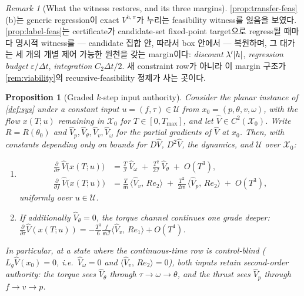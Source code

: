 \documentclass[11pt]{article}
\theoremstyle{plain}
\newtheorem{proposition}[theorem]{Proposition}
\theoremstyle{definition}
\theoremstyle{remark}
\newtheorem{remark}[theorem]{Remark}
\DeclarePairedDelimiter{\abs}{\lvert}{\rvert}
\newcommand{\inner}[2]{\langle #1,\,#2\rangle}
\newcommand{\calX}{\mathcal{X}}
\newcommand{\calU}{\mathcal{U}}
\newcommand{\Vhp}[1]{V^{h,#1}}
\newcommand{\Vhpi}{\Vhp{\pi}}
\newcommand{\Vhat}{\widehat V}
\newcommand{\mass}{\mathsf m}
\newcommand{\inertia}{\mathcal I}
\newcommand{\Lg}{L_g}
\begin{document}
\begin{remark}[What the witness restores, and its three margins]\label{rem:label-margins}
\cref{prop:transfer-feas}(b)는 generic regression이 exact $\Vhpi$가 누리는 feasibility witness를
잃음을 보였다. \cref{prop:label-feas}는 certificate가 candidate-set fixed-point target으로 regress될
때마다 명시적 witness를 --- candidate 집합 안, 따라서 box 안에서 --- 복원하며, 그 대가는 세 개의
개별 제어 가능한 원천을 갖는 margin이다: \emph{discount} $\lambda'\abs{h}$, \emph{regression
budget} $\varepsilon/\Delta t$, \emph{integration} $C_2\Delta t/2$. 새 constraint row가 아니라 이
margin 구조가 \cref{rem:viability}의 recursive-feasibility 정제가 사는 곳이다.
\end{remark}

\begin{proposition}[Graded $k$-step input authority]\label{prop:kstep}
Consider the planar instance of \cref{def:sys} under a constant input $u=(f,\tau)\in\calU$ from
$x_0=(p,\theta,v,\omega)$, with the flow $x(T;u)$ remaining in $\calX_0$ for
$T\in[0,T_{\max}]$, and let $\Vhat\in C^2(\calX_0)$. Write $R=R(\theta_0)$ and
$\Vhat_p,\Vhat_\theta,\Vhat_v,\Vhat_\omega$ for the partial gradients of $\Vhat$ at $x_0$. Then,
with constants depending only on bounds for $D\Vhat$, $D^2\Vhat$, the dynamics, and $\calU$
over $\calX_0$:
\begin{enumerate}[label=(\alph*)]
  \item \begin{align}
  \frac{\partial}{\partial\tau}\,\Vhat\big(x(T;u)\big)
  &= \frac{T}{\inertia}\,\Vhat_\omega \;+\; \frac{T^2}{2\inertia}\,\Vhat_\theta \;+\; O(T^3),\\
  \frac{\partial}{\partial f}\,\Vhat\big(x(T;u)\big)
  &= \frac{T}{\mass}\,\inner{\Vhat_v}{Re_2} \;+\;
     \frac{T^2}{2\mass}\,\inner{\Vhat_p}{Re_2} \;+\; O(T^3),
  \end{align}
  uniformly over $u\in\calU$.
  \item If additionally $\Vhat_\theta=0$, the torque channel continues one grade deeper:
  $\frac{\partial}{\partial\tau}\Vhat(x(T;u)) = -\frac{T^3}{6}\frac{f}{\mass\inertia}
  \inner{\Vhat_v}{Re_1} + O(T^4)$.
\end{enumerate}
In particular, at a state where the continuous-time row is control-blind
($\Lg\Vhat(x_0)=0$, i.e.\ $\Vhat_\omega=0$ and $\inner{\Vhat_v}{Re_2}=0$), both inputs retain
\emph{second-order} authority: the torque sees $\Vhat_\theta$ through $\tau\to\omega\to\theta$,
and the thrust sees $\Vhat_p$ through $f\to v\to p$.
\end{proposition}
\end{document}
